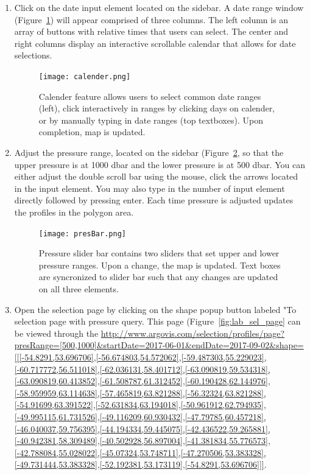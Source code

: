 \begin{enumerate}
\item Click on the date input element located on the sidebar. A date range window (Figure~\ref{fig:calender}) will appear comprised of three columns. The left column is an array of buttons with relative times that users can select. The center and right columns display an interactive scrollable calendar that allows for date selections.

\begin{figure}[H]
\begin{minipage}{6in}
\centering
\texttt{[image: calender.png]}
\caption{\label{fig:calender} Calender feature allows users to select common date ranges (left), click interactively in ranges by clicking days on calender, or by manually typing in date ranges (top textboxes). Upon completion, map is updated. }
\end{minipage}
\end{figure}

\item Adjust the pressure range, located on the sidebar (Figure~\ref{fig:pres_bar}, so that the upper pressure is at 1000 dbar and the lower pressure is at 500 dbar. You can either adjust the double scroll bar using the mouse, click the arrows located in the input element. You may also type in the number of input element directly followed by pressing enter. Each time pressure is adjusted updates the profiles in the polygon area.

\begin{figure}[H]
\begin{minipage}{6in}
\centering
\texttt{[image: presBar.png]}
\caption{\label{fig:pres_bar} Pressure slider bar contains two sliders that set upper and lower pressure ranges. Upon a change, the map is updated. Text boxes are syncronized to slider bar such that any changes are updated on all three elements.}
\end{minipage}
\end{figure}

\item Open the selection page by clicking on the shape popup button labeled "To selection page with pressure query. This page (Figure~\ref{fig:lab_sel_page} can be viewed through the \url{http://www.argovis.com/selection/profiles/page?presRange=[500,1000]&startDate=2017-06-01&endDate=2017-09-02&shape=[[[-54.8291,53.696706],[-56.674803,54.572062],[-59.487303,55.229023],[-60.717772,56.511018],[-62.036131,58.401712],[-63.090819,59.534318],[-63.090819,60.413852],[-61.508787,61.312452],[-60.190428,62.144976],[-58.959959,63.114638],[-57.465819,63.821288],[-56.32324,63.821288],[-54.91699,63.391522],[-52.631834,63.194018],[-50.961912,62.794935],[-49.995115,61.731526],[-49.116209,60.930432],[-47.79785,60.457218],[-46.040037,59.756395],[-44.194334,59.445075],[-42.436522,59.265881],[-40.942381,58.309489],[-40.502928,56.897004],[-41.381834,55.776573],[-42.788084,55.028022],[-45.07324,53.748711],[-47.270506,53.383328],[-49.731444,53.383328],[-52.192381,53.173119],[-54.8291,53.696706]]]}.


\end{enumerate}
